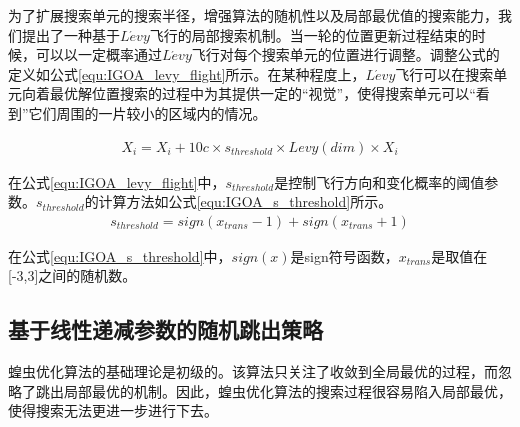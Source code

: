 为了扩展搜索单元的搜索半径，增强算法的随机性以及局部最优值的搜索能力，我们提出了一种基于$L\acute{e}vy$飞行的局部搜索机制。当一轮的位置更新过程结束的时候，可以以一定概率通过$L\acute{e}vy$飞行对每个搜索单元的位置进行调整。调整公式的定义如公式\ref{equ:IGOA_levy_flight}所示。在某种程度上，$L\acute{e}vy$飞行可以在搜索单元向着最优解位置搜索的过程中为其提供一定的“视觉”，使得搜索单元可以“看到”它们周围的一片较小的区域内的情况。

\begin{eqnarray}\label{equ:IGOA_levy_flight}
	X_i=X_i+10c\times s_{threshold}\times Levy(dim)\times X_i
\end{eqnarray}

在公式\ref{equ:IGOA_levy_flight}中，$s_{threshold}$是控制飞行方向和变化概率的阈值参数。$s_{threshold}$的计算方法如公式\ref{equ:IGOA_s_threshold}所示。
\begin{eqnarray}\label{equ:IGOA_s_threshold}
	s_{threshold}=sign(x_{trans}-1)+sign(x_{trans}+1)
\end{eqnarray}

在公式\ref{equ:IGOA_s_threshold}中，$sign(x)$是sign符号函数，$x_{trans}$是取值在[-3,3]之间的随机数。
\subsection{基于线性递减参数的随机跳出策略}

蝗虫优化算法的基础理论是初级的。该算法只关注了收敛到全局最优的过程，而忽略了跳出局部最优的机制。因此，蝗虫优化算法的搜索过程很容易陷入局部最优，使得搜索无法更进一步进行下去。


